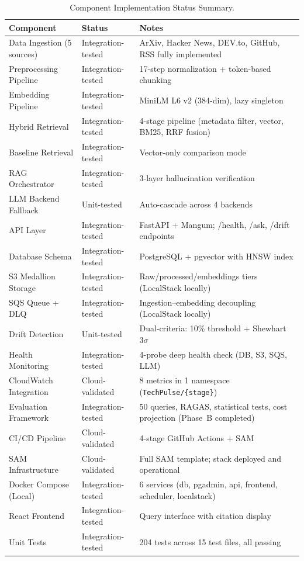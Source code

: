 \begin{table}[htbp]
\caption{Component Implementation Status Summary.}
\label{tab:impl_status}
\centering
\begin{tabular}{p{4.2cm}p{2.8cm}p{5.5cm}}
\toprule
\textbf{Component} & \textbf{Status} & \textbf{Notes} \\
\midrule
Data Ingestion (5 sources) & Integration-tested & ArXiv, Hacker News, DEV.to, GitHub, RSS fully implemented \\
Preprocessing Pipeline & Integration-tested & 17-step normalization + token-based chunking \\
Embedding Pipeline & Integration-tested & MiniLM L6 v2 (384-dim), lazy singleton \\
Hybrid Retrieval & Integration-tested & 4-stage pipeline (metadata filter, vector, BM25, RRF fusion) \\
Baseline Retrieval & Integration-tested & Vector-only comparison mode \\
RAG Orchestrator & Integration-tested & 3-layer hallucination verification \\
LLM Backend Fallback & Unit-tested & Auto-cascade across 4 backends \\
API Layer & Integration-tested & FastAPI + Mangum; /health, /ask, /drift endpoints \\
Database Schema & Integration-tested & PostgreSQL + pgvector with HNSW index \\
S3 Medallion Storage & Integration-tested & Raw/processed/embeddings tiers (LocalStack locally) \\
SQS Queue + DLQ & Integration-tested & Ingestion--embedding decoupling (LocalStack locally) \\
Drift Detection & Unit-tested & Dual-criteria: 10\% threshold + Shewhart $3\sigma$ \\
Health Monitoring & Integration-tested & 4-probe deep health check (DB, S3, SQS, LLM) \\
CloudWatch Integration & Cloud-validated & 8 metrics in 1 namespace (\texttt{TechPulse/\{stage\}}) \\
Evaluation Framework & Integration-tested & 50 queries, RAGAS, statistical tests, cost projection (Phase~B completed) \\
CI/CD Pipeline & Cloud-validated & 4-stage GitHub Actions + SAM \\
SAM Infrastructure & Cloud-validated & Full SAM template; stack deployed and operational \\
Docker Compose (Local) & Integration-tested & 6 services (db, pgadmin, api, frontend, scheduler, localstack) \\
React Frontend & Integration-tested & Query interface with citation display \\
Unit Tests & Integration-tested & 204 tests across 15 test files, all passing \\
\bottomrule
\end{tabular}
\end{table}

